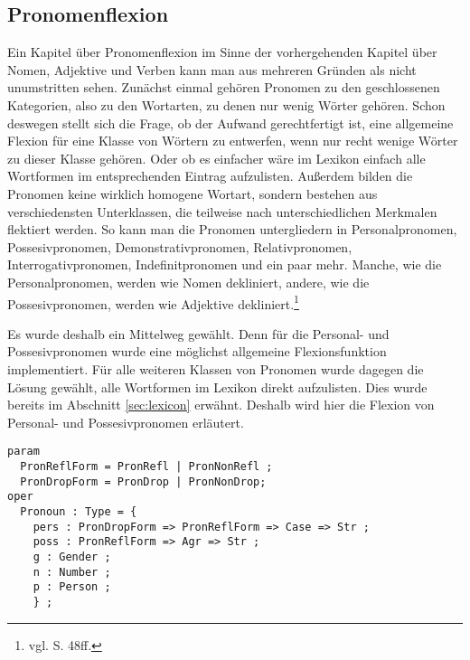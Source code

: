 \subsection{Pronomenflexion}
\label{subsec:pronomen}
Ein Kapitel über Pronomenflexion im Sinne der vorhergehenden Kapitel über Nomen, Adjektive und Verben kann man aus mehreren Gründen als nicht unumstritten sehen. Zunächst einmal gehören Pronomen zu den geschlossenen Kategorien, also zu den Wortarten, zu denen nur wenig Wörter gehören. Schon deswegen stellt sich die Frage, ob der Aufwand gerechtfertigt ist, eine allgemeine Flexion für eine Klasse von Wörtern zu entwerfen, wenn nur recht wenige Wörter zu dieser Klasse gehören. Oder ob es einfacher wäre im Lexikon einfach alle Wortformen im entsprechenden Eintrag aufzulisten. Außerdem bilden die Pronomen keine wirklich homogene Wortart, sondern bestehen aus verschiedensten Unterklassen, die teilweise nach unterschiedlichen Merkmalen flektiert werden. So kann man die Pronomen untergliedern in Personalpronomen, Possesivpronomen, Demonstrativpronomen, Relativpronomen, Interrogativpronomen, Indefinitpronomen und ein paar mehr. Manche, wie die Personalpronomen, werden wie Nomen dekliniert, andere, wie die Possesivpronomen, werden wie Adjektive dekliniert.\footnote{vgl. \cite{BAYER-LINDAUER1994} S. 48ff.} \par
Es wurde deshalb ein Mittelweg gewählt. Denn für die Personal- und Possesivpronomen wurde eine möglichst allgemeine Flexionsfunktion implementiert. Für alle weiteren Klassen von Pronomen wurde dagegen die Lösung gewählt, alle Wortformen im Lexikon direkt aufzulisten. Dies wurde bereits im Abschnitt \ref{sec:lexicon} erwähnt. Deshalb wird hier die Flexion von Personal- und Possesivpronomen erläutert. \par
\begin{lstlisting}[float=h!tp,caption={Typ für Pronomen (vgl. \textbf{ResLat.gf})},label={GF-Res-Pronoun},basicstyle=\small]
param
  PronReflForm = PronRefl | PronNonRefl ;
  PronDropForm = PronDrop | PronNonDrop;
oper
  Pronoun : Type = {
    pers : PronDropForm => PronReflForm => Case => Str ;
    poss : PronReflForm => Agr => Str ;
    g : Gender ;
    n : Number ;
    p : Person ;
    } ;
\end{lstlisting}
